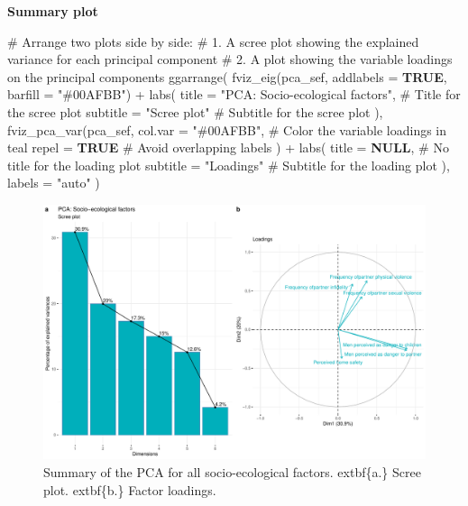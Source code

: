 \documentclass[
  bookmarksnumbered]{article}
\newenvironment{Shaded}{\begin{snugshade}}{\end{snugshade}}
\newcommand{\AttributeTok}[1]{\textcolor[rgb]{0.80,0.80,0.80}{#1}}
\newcommand{\CommentTok}[1]{\textcolor[rgb]{0.50,0.62,0.50}{#1}}
\newcommand{\ConstantTok}[1]{\textcolor[rgb]{0.86,0.64,0.64}{\textbf{#1}}}
\newcommand{\FunctionTok}[1]{\textcolor[rgb]{0.94,0.94,0.56}{#1}}
\newcommand{\NormalTok}[1]{\textcolor[rgb]{0.80,0.80,0.80}{#1}}
\newcommand{\SpecialCharTok}[1]{\textcolor[rgb]{0.86,0.64,0.64}{#1}}
\newcommand{\StringTok}[1]{\textcolor[rgb]{0.80,0.58,0.58}{#1}}
\begin{document}
\textbf{Summary plot}

\begin{Shaded}
\begin{Highlighting}[]
\CommentTok{\# Arrange two plots side by side: }
\CommentTok{\# 1. A scree plot showing the explained variance for each principal component}
\CommentTok{\# 2. A plot showing the variable loadings on the principal components}
\FunctionTok{ggarrange}\NormalTok{(}
  \FunctionTok{fviz\_eig}\NormalTok{(pca\_sef, }\AttributeTok{addlabels =} \ConstantTok{TRUE}\NormalTok{, }\AttributeTok{barfill =} \StringTok{"\#00AFBB"}\NormalTok{) }\SpecialCharTok{+}
    \FunctionTok{labs}\NormalTok{(}
      \AttributeTok{title =} \StringTok{"PCA: Socio{-}ecological factors"}\NormalTok{,  }\CommentTok{\# Title for the scree plot}
      \AttributeTok{subtitle =} \StringTok{"Scree plot"}  \CommentTok{\# Subtitle for the scree plot}
\NormalTok{    ),}
  \FunctionTok{fviz\_pca\_var}\NormalTok{(pca\_sef,}
    \AttributeTok{col.var =} \StringTok{"\#00AFBB"}\NormalTok{,  }\CommentTok{\# Color the variable loadings in teal}
    \AttributeTok{repel =} \ConstantTok{TRUE}  \CommentTok{\# Avoid overlapping labels}
\NormalTok{  ) }\SpecialCharTok{+}
    \FunctionTok{labs}\NormalTok{(}
      \AttributeTok{title =} \ConstantTok{NULL}\NormalTok{,  }\CommentTok{\# No title for the loading plot}
      \AttributeTok{subtitle =} \StringTok{"Loadings"}  \CommentTok{\# Subtitle for the loading plot}
\NormalTok{    ),}
  \AttributeTok{labels =} \StringTok{"auto"}
\NormalTok{)}
\end{Highlighting}
\end{Shaded}

\begin{figure}
\centering
\includegraphics{Supplementary_material_files/figure-latex/pca-sef-plot-1.pdf}
\caption{\label{fig:pca-sef-plot}Summary of the PCA for all socio-ecological factors. extbf\{a.\} Scree plot. extbf\{b.\} Factor loadings.}
\end{figure}
\end{document}
